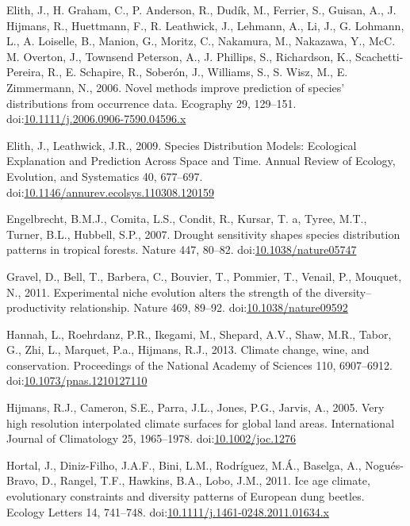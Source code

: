 \hypertarget{ref-Elith2006}{}
Elith, J., H. Graham, C., P. Anderson, R., Dudík, M., Ferrier, S.,
Guisan, A., J. Hijmans, R., Huettmann, F., R. Leathwick, J., Lehmann,
A., Li, J., G. Lohmann, L., A. Loiselle, B., Manion, G., Moritz, C.,
Nakamura, M., Nakazawa, Y., McC. M. Overton, J., Townsend Peterson, A.,
J. Phillips, S., Richardson, K., Scachetti-Pereira, R., E. Schapire, R.,
Soberón, J., Williams, S., S. Wisz, M., E. Zimmermann, N., 2006. Novel
methods improve prediction of species' distributions from occurrence
data. Ecography 29, 129--151.
doi:\href{https://doi.org/10.1111/j.2006.0906-7590.04596.x}{10.1111/j.2006.0906-7590.04596.x}

\hypertarget{ref-Elith2009a}{}
Elith, J., Leathwick, J.R., 2009. Species Distribution Models:
Ecological Explanation and Prediction Across Space and Time. Annual
Review of Ecology, Evolution, and Systematics 40, 677--697.
doi:\href{https://doi.org/10.1146/annurev.ecolsys.110308.120159}{10.1146/annurev.ecolsys.110308.120159}

\hypertarget{ref-Engelbrecht2007}{}
Engelbrecht, B.M.J., Comita, L.S., Condit, R., Kursar, T. a, Tyree,
M.T., Turner, B.L., Hubbell, S.P., 2007. Drought sensitivity shapes
species distribution patterns in tropical forests. Nature 447, 80--82.
doi:\href{https://doi.org/10.1038/nature05747}{10.1038/nature05747}

\hypertarget{ref-Gravel2011c}{}
Gravel, D., Bell, T., Barbera, C., Bouvier, T., Pommier, T., Venail, P.,
Mouquet, N., 2011. Experimental niche evolution alters the strength of
the diversity--productivity relationship. Nature 469, 89--92.
doi:\href{https://doi.org/10.1038/nature09592}{10.1038/nature09592}

\hypertarget{ref-Hannah2013}{}
Hannah, L., Roehrdanz, P.R., Ikegami, M., Shepard, A.V., Shaw, M.R.,
Tabor, G., Zhi, L., Marquet, P.a., Hijmans, R.J., 2013. Climate change,
wine, and conservation. Proceedings of the National Academy of Sciences
110, 6907--6912.
doi:\href{https://doi.org/10.1073/pnas.1210127110}{10.1073/pnas.1210127110}

\hypertarget{ref-Hijmans2005}{}
Hijmans, R.J., Cameron, S.E., Parra, J.L., Jones, P.G., Jarvis, A.,
2005. Very high resolution interpolated climate surfaces for global land
areas. International Journal of Climatology 25, 1965--1978.
doi:\href{https://doi.org/10.1002/joc.1276}{10.1002/joc.1276}

\hypertarget{ref-Hortal2011}{}
Hortal, J., Diniz-Filho, J.A.F., Bini, L.M., Rodríguez, M.Á., Baselga,
A., Nogués-Bravo, D., Rangel, T.F., Hawkins, B.A., Lobo, J.M., 2011. Ice
age climate, evolutionary constraints and diversity patterns of European
dung beetles. Ecology Letters 14, 741--748.
doi:\href{https://doi.org/10.1111/j.1461-0248.2011.01634.x}{10.1111/j.1461-0248.2011.01634.x}

